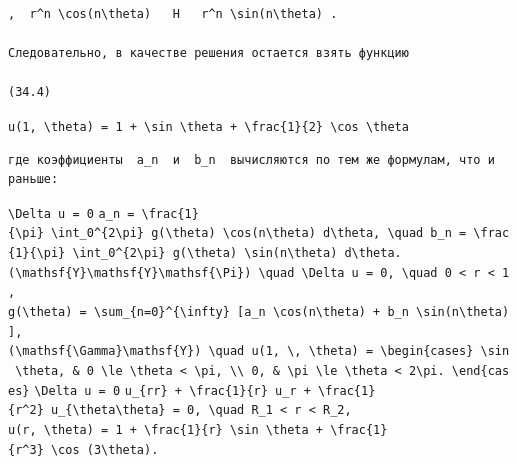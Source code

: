 \documentclass[
  ukrainian,
]{article}
\begin{document}
\begin{verbatim}
,  r^n \cos(n\theta)   H   r^n \sin(n\theta) .

Следовательно, в качестве решения остается взять функцию

(34.4)
\end{verbatim}

\texttt{u(1,\ \textbackslash{}theta)\ =\ 1\ +\ \textbackslash{}sin\ \textbackslash{}theta\ +\ \textbackslash{}frac\{1\}\{2\}\ \textbackslash{}cos\ \textbackslash{}theta}

\begin{verbatim}
где коэффициенты  a_n  и  b_n  вычисляются по тем же формулам, что и раньше:
\end{verbatim}

\texttt{\textbackslash{}Delta\ u\ =\ 0}
\texttt{a\_n\ =\ \textbackslash{}frac\{1\}\{\textbackslash{}pi\}\ \textbackslash{}int\_0\^{}\{2\textbackslash{}pi\}\ g(\textbackslash{}theta)\ \textbackslash{}cos(n\textbackslash{}theta)\ d\textbackslash{}theta,\ \textbackslash{}quad\ b\_n\ =\ \textbackslash{}frac\{1\}\{\textbackslash{}pi\}\ \textbackslash{}int\_0\^{}\{2\textbackslash{}pi\}\ g(\textbackslash{}theta)\ \textbackslash{}sin(n\textbackslash{}theta)\ d\textbackslash{}theta.}
\texttt{(\textbackslash{}mathsf\{Y\}\textbackslash{}mathsf\{Y\}\textbackslash{}mathsf\{\textbackslash{}Pi\})\ \textbackslash{}quad\ \textbackslash{}Delta\ u\ =\ 0,\ \textbackslash{}quad\ 0\ \textless{}\ r\ \textless{}\ 1,}
\texttt{g(\textbackslash{}theta)\ =\ \textbackslash{}sum\_\{n=0\}\^{}\{\textbackslash{}infty\}\ {[}a\_n\ \textbackslash{}cos(n\textbackslash{}theta)\ +\ b\_n\ \textbackslash{}sin(n\textbackslash{}theta){]},}
\texttt{(\textbackslash{}mathsf\{\textbackslash{}Gamma\}\textbackslash{}mathsf\{Y\})\ \textbackslash{}quad\ u(1,\ \textbackslash{},\ \textbackslash{}theta)\ =\ \textbackslash{}begin\{cases\}\ \textbackslash{}sin\ \textbackslash{}theta,\ \&\ 0\ \textbackslash{}le\ \textbackslash{}theta\ \textless{}\ \textbackslash{}pi,\ \textbackslash{}\textbackslash{}\ 0,\ \&\ \textbackslash{}pi\ \textbackslash{}le\ \textbackslash{}theta\ \textless{}\ 2\textbackslash{}pi.\ \textbackslash{}end\{cases\}}
\texttt{\textbackslash{}Delta\ u\ =\ 0}
\texttt{u\_\{rr\}\ +\ \textbackslash{}frac\{1\}\{r\}\ u\_r\ +\ \textbackslash{}frac\{1\}\{r\^{}2\}\ u\_\{\textbackslash{}theta\textbackslash{}theta\}\ =\ 0,\ \textbackslash{}quad\ R\_1\ \textless{}\ r\ \textless{}\ R\_2,}
\texttt{u(r,\ \textbackslash{}theta)\ =\ 1\ +\ \textbackslash{}frac\{1\}\{r\}\ \textbackslash{}sin\ \textbackslash{}theta\ +\ \textbackslash{}frac\{1\}\{r\^{}3\}\ \textbackslash{}cos\ (3\textbackslash{}theta).}
\end{document}
